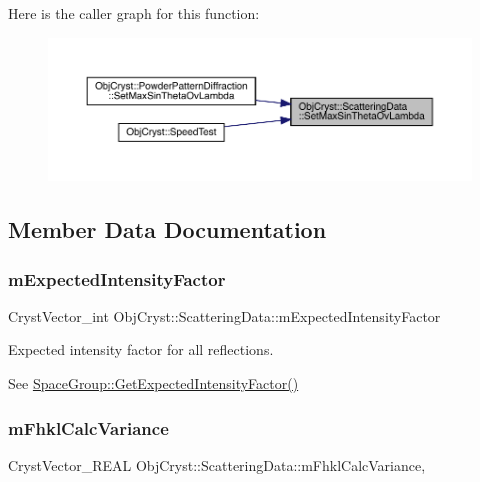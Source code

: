 Here is the caller graph for this function\+:
\nopagebreak
\begin{figure}[H]
\begin{center}
\leavevmode
\includegraphics[width=350pt]{class_obj_cryst_1_1_scattering_data_a58e988862eb0e7b128a563e38f07eb22_icgraph}
\end{center}
\end{figure}


\subsection{Member Data Documentation}
\mbox{\label{class_obj_cryst_1_1_scattering_data_a8296cf05015c7c4bbfc1dc7b443e3096}} 
\subsubsection{\texorpdfstring{mExpectedIntensityFactor}{mExpectedIntensityFactor}}
{\footnotesize\ttfamily Cryst\+Vector\+\_\+int Obj\+Cryst\+::\+Scattering\+Data\+::m\+Expected\+Intensity\+Factor\hspace{0.3cm}{\ttfamily [protected]}}

Expected intensity factor for all reflections.

See \mbox{\hyperlink{class_obj_cryst_1_1_space_group_a6f0b08e8a3e713b596bc424407859d7a}{Space\+Group\+::\+Get\+Expected\+Intensity\+Factor()}} \mbox{\label{class_obj_cryst_1_1_scattering_data_a85ab0dd2973824fc2ad62fb6fef2e274}} 
\subsubsection{\texorpdfstring{mFhklCalcVariance}{mFhklCalcVariance}}
{\footnotesize\ttfamily Cryst\+Vector\+\_\+\+R\+E\+AL Obj\+Cryst\+::\+Scattering\+Data\+::m\+Fhkl\+Calc\+Variance\hspace{0.3cm}{\ttfamily [mutable]}, {\ttfamily [protected]}}

